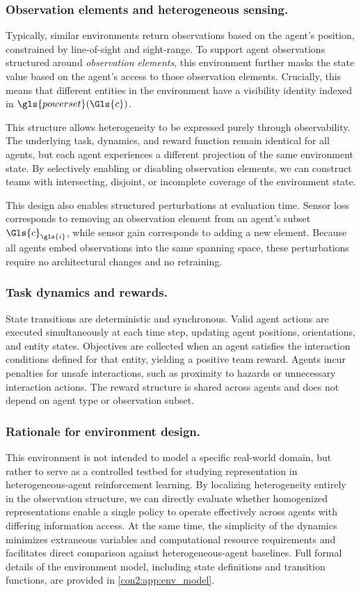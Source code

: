 \documentclass[]{jair}
\begin{document}
\subsubsection{Observation elements and heterogeneous sensing.}
Typically, similar environments return observations based on 
the agent's position, constrained by line-of-sight and sight-range.
To support agent observations structured around \emph{observation elements},
this environment further masks the state value based on the agent's access 
to those observation elements.
Crucially, this means that different entities in the environment 
have a visibility identity indexed in \(\gls{powerset}(\Gls{c})\).%

This structure allows heterogeneity to be expressed purely through
observability.
The underlying task, dynamics, and reward function remain identical
for all agents, but each agent experiences a different projection of
the same environment state.
By selectively enabling or disabling observation elements, we can
construct teams with intersecting, disjoint, or incomplete coverage of
the environment state.

This design also enables structured perturbations at evaluation time.
Sensor loss corresponds to removing an observation element from an agent's subset 
\(\Gls{c}_{\gls{i}}\), while sensor gain corresponds to adding a new element.
Because all agents embed observations into the same spanning space,
these perturbations require no architectural changes and no retraining.

\subsubsection{Task dynamics and rewards.}
State transitions are deterministic and synchronous.
Valid agent actions are executed simultaneously at each time step,
updating agent positions, orientations, and entity states.
Objectives are collected when an agent satisfies the interaction
conditions defined for that entity, yielding a positive team reward.
Agents incur penalties for unsafe interactions, such as proximity to
hazards or unnecessary interaction actions.
The reward structure is shared across agents and does not depend on
agent type or observation subset.

\subsubsection{Rationale for environment design.}
This environment is not intended to model a specific real-world domain,
but rather to serve as a controlled testbed for studying representation
in heterogeneous-agent reinforcement learning.
By localizing heterogeneity entirely in the observation structure,
we can directly evaluate whether homogenized representations enable a
single policy to operate effectively across agents with differing
information access. At the same time, the simplicity of the dynamics 
minimizes extraneous variables and computational resource requirements and
facilitates direct comparison against heterogeneous-agent baselines.
Full formal details of the environment model, including state
definitions and transition functions, are provided in
\cref{con2:app:env_model}.
\end{document}
